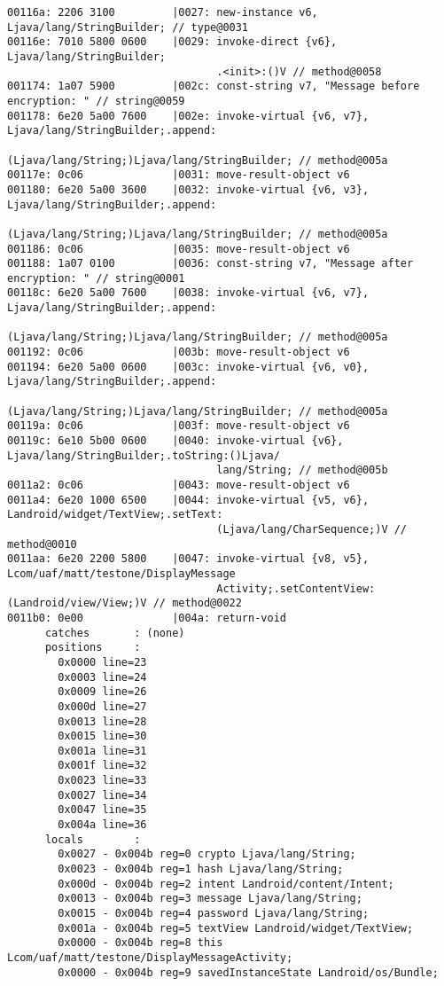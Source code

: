 \begin{lstlisting}
00116a: 2206 3100         |0027: new-instance v6, Ljava/lang/StringBuilder; // type@0031
00116e: 7010 5800 0600    |0029: invoke-direct {v6}, Ljava/lang/StringBuilder;
                                 .<init>:()V // method@0058
001174: 1a07 5900         |002c: const-string v7, "Message before encryption: " // string@0059
001178: 6e20 5a00 7600    |002e: invoke-virtual {v6, v7}, Ljava/lang/StringBuilder;.append:
                                 (Ljava/lang/String;)Ljava/lang/StringBuilder; // method@005a
00117e: 0c06              |0031: move-result-object v6
001180: 6e20 5a00 3600    |0032: invoke-virtual {v6, v3}, Ljava/lang/StringBuilder;.append:
                                 (Ljava/lang/String;)Ljava/lang/StringBuilder; // method@005a
001186: 0c06              |0035: move-result-object v6
001188: 1a07 0100         |0036: const-string v7, "Message after encryption: " // string@0001
00118c: 6e20 5a00 7600    |0038: invoke-virtual {v6, v7}, Ljava/lang/StringBuilder;.append:
                                 (Ljava/lang/String;)Ljava/lang/StringBuilder; // method@005a
001192: 0c06              |003b: move-result-object v6
001194: 6e20 5a00 0600    |003c: invoke-virtual {v6, v0}, Ljava/lang/StringBuilder;.append:
                                 (Ljava/lang/String;)Ljava/lang/StringBuilder; // method@005a
00119a: 0c06              |003f: move-result-object v6
00119c: 6e10 5b00 0600    |0040: invoke-virtual {v6}, Ljava/lang/StringBuilder;.toString:()Ljava/
                                 lang/String; // method@005b
0011a2: 0c06              |0043: move-result-object v6
0011a4: 6e20 1000 6500    |0044: invoke-virtual {v5, v6}, Landroid/widget/TextView;.setText:
                                 (Ljava/lang/CharSequence;)V // method@0010
0011aa: 6e20 2200 5800    |0047: invoke-virtual {v8, v5}, Lcom/uaf/matt/testone/DisplayMessage
                                 Activity;.setContentView:(Landroid/view/View;)V // method@0022
0011b0: 0e00              |004a: return-void
      catches       : (none)
      positions     :
        0x0000 line=23
        0x0003 line=24
        0x0009 line=26
        0x000d line=27
        0x0013 line=28
        0x0015 line=30
        0x001a line=31
        0x001f line=32
        0x0023 line=33
        0x0027 line=34
        0x0047 line=35
        0x004a line=36
      locals        :
        0x0027 - 0x004b reg=0 crypto Ljava/lang/String;
        0x0023 - 0x004b reg=1 hash Ljava/lang/String;
        0x000d - 0x004b reg=2 intent Landroid/content/Intent;
        0x0013 - 0x004b reg=3 message Ljava/lang/String;
        0x0015 - 0x004b reg=4 password Ljava/lang/String;
        0x001a - 0x004b reg=5 textView Landroid/widget/TextView;
        0x0000 - 0x004b reg=8 this Lcom/uaf/matt/testone/DisplayMessageActivity;
        0x0000 - 0x004b reg=9 savedInstanceState Landroid/os/Bundle;


\end{lstlisting}
